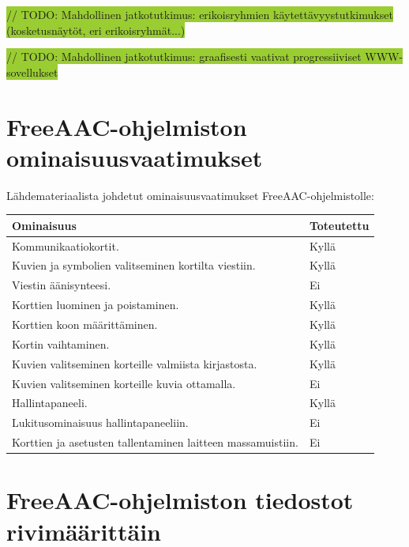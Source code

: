 \documentclass[utf8]{gradu3}
\begin{document}
\colorbox{YellowGreen}{// TODO: Mahdollinen jatkotutkimus: erikoisryhmien käytettävyystutkimukset (kosketusnäytöt, eri erikoisryhmät...)}

\colorbox{YellowGreen}{// TODO: Mahdollinen jatkotutkimus: graafisesti vaativat progressiiviset WWW-sovellukset}


\printbibliography

%

\appendix

\section{FreeAAC-ohjelmiston ominaisuusvaatimukset}

Lähdemateriaalista johdetut ominaisuusvaatimukset FreeAAC-ohjelmistolle:

\begin{center}
    \begin{tabular}{ | l | l |}
    \hline
    \textbf{Ominaisuus} & \textbf{Toteutettu} \\ \hline
    Kommunikaatiokortit. & Kyllä \\ \hline
    Kuvien ja symbolien valitseminen kortilta viestiin. & Kyllä \\ \hline
    Viestin äänisynteesi. & Ei \\ \hline
    Korttien luominen ja poistaminen. & Kyllä \\ \hline
    Korttien koon määrittäminen. & Kyllä \\ \hline
    Kortin vaihtaminen. & Kyllä \\ \hline
    Kuvien valitseminen korteille valmiista kirjastosta. & Kyllä \\ \hline
    Kuvien valitseminen korteille kuvia ottamalla. & Ei \\ \hline
    Hallintapaneeli. & Kyllä \\ \hline
    Lukitusominaisuus hallintapaneeliin. & Ei \\ \hline
    Korttien ja asetusten tallentaminen laitteen massamuistiin. & Ei \\ \hline
    \end{tabular}
\end{center}

\section{FreeAAC-ohjelmiston tiedostot rivimäärittäin}
\end{document}
